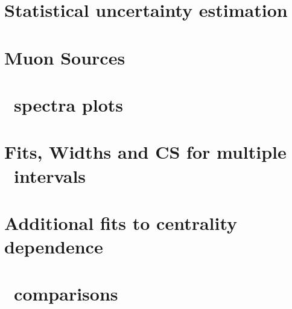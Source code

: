 \documentclass[NOTE,UKenglish,coverpage,txfonts,texlive=2019]{\ATLASLATEXPATH atlasdoc}
\begin{document}
\section{Statistical uncertainty estimation}
\label{sec:stat_errs}

\clearpage
\section{Muon Sources}
\label{sec:muon_sources}

\clearpage

\clearpage



\section{\ptbar\ spectra plots}
\label{sec:meanpT}

\clearpage
\section{Fits, Widths and CS for multiple \pt\ intervals}
\label{sec:multiple_pt}

\clearpage
\section{Additional fits to centrality dependence}
\label{sec:fits_slope}

\clearpage
\section{\powheg\ comparisons}
\label{sec:powheg}

\clearpage
\end{document}
